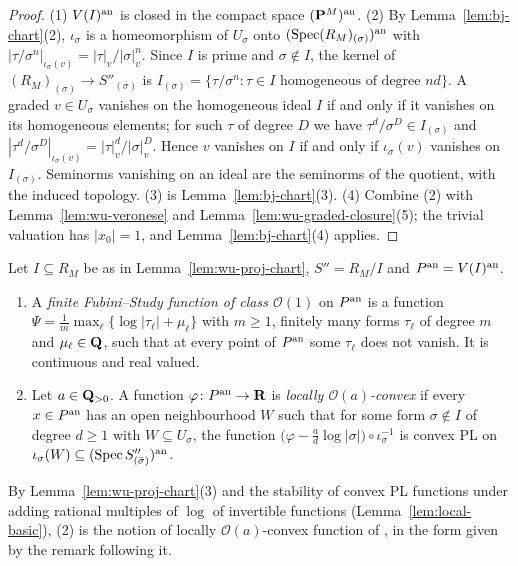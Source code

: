 \begin{proof}
(1) $V(I)^{\mathrm{an}}$ is closed in the compact space $(\mathbf{P}^M)^{\mathrm{an}}$. (2) By Lemma~\ref{lem:bj-chart}(2), $\iota_\sigma$ is a
homeomorphism of $U_\sigma$ onto $(\operatorname{Spec}(R_M)_{(\sigma)})^{\mathrm{an}}$ with $|\tau/\sigma^n|_{\iota_\sigma(v)}=|\tau|_v/|\sigma|_v^n$.
Since $I$ is prime and $\sigma\notin I$, the kernel of $(R_M)_{(\sigma)}\to S''_{(\bar\sigma)}$ is
$I_{(\sigma)}=\{\tau/\sigma^n:\tau\in I\text{ homogeneous of degree }nd\}$. A graded $v\in U_\sigma$ vanishes on the
homogeneous ideal $I$ if and only if it vanishes on its homogeneous elements; for such $\tau$ of degree $D$ we have
$\tau^d/\sigma^D\in I_{(\sigma)}$ and $|\tau^d/\sigma^D|_{\iota_\sigma(v)}=|\tau|_v^d/|\sigma|_v^D$. Hence $v$ vanishes on $I$
if and only if $\iota_\sigma(v)$ vanishes on $I_{(\sigma)}$. Seminorms vanishing on an ideal are the seminorms of the
quotient, with the induced topology. (3) is Lemma~\ref{lem:bj-chart}(3). (4) Combine (2) with
Lemma~\ref{lem:wu-veronese} and Lemma~\ref{lem:wu-graded-closure}(5); the trivial valuation has $|x_0|=1$, and
Lemma~\ref{lem:bj-chart}(4) applies.
\end{proof}

\begin{definition}\label{def:wu-proj-functions}
\leanok
{}
Let $I\subseteq R_M$ be as in Lemma~\ref{lem:wu-proj-chart}, $S''=R_M/I$ and $P^{\mathrm{an}}=V(I)^{\mathrm{an}}$.
\begin{enumerate}
\item A \emph{finite Fubini--Study function of class $\mathcal O(1)$} on $P^{\mathrm{an}}$ is a function
$\Psi=\frac1m\max_\ell\{\log|\tau_\ell|+\mu_\ell\}$ with $m\ge1$, finitely many forms $\tau_\ell$ of degree $m$ and
$\mu_\ell\in\mathbf{Q}$, such that at every point of $P^{\mathrm{an}}$ some $\tau_\ell$ does not vanish. It is continuous and real valued.
\item Let $a\in\mathbf{Q}_{>0}$. A function $\varphi\colon P^{\mathrm{an}}\to\mathbf{R}$ is \emph{locally $\mathcal O(a)$-convex} if every
$x\in P^{\mathrm{an}}$ has an open neighbourhood $W$ such that for some form $\sigma\notin I$ of degree $d\ge1$ with
$W\subseteq U_\sigma$, the function $\bigl(\varphi-\frac ad\log|\sigma|\bigr)\circ\iota_\sigma^{-1}$ is convex PL on
$\iota_\sigma(W)\subseteq(\operatorname{Spec} S''_{(\bar\sigma)})^{\mathrm{an}}$.
\end{enumerate}
By Lemma~\ref{lem:wu-proj-chart}(3) and the stability of convex PL functions under adding rational multiples of
$\log$ of invertible functions (Lemma~\ref{lem:local-basic}), (2) is the notion of locally $\mathcal O(a)$-convex
function of \cite[Definition~5.3]{FHX}, in the form given by the remark following it.
\end{definition}


